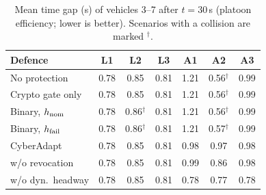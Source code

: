 \begin{table}[!t]\centering\caption{Mean time gap (s) of vehicles 3--7 after $t=30$\,s (platoon efficiency; lower is better). Scenarios with a collision are marked $^\dagger$.}\label{tab:hw}\footnotesize\setlength{\tabcolsep}{2.5pt}\begin{tabular}{lcccccc}\toprule
Defence & L1 & L2 & L3 & A1 & A2 & A3\\\midrule
No protection & 0.78 & 0.85 & 0.81 & 1.21 & 0.56$^\dagger$ & 0.99\\
Crypto gate only & 0.78 & 0.85 & 0.81 & 1.21 & 0.56$^\dagger$ & 0.99\\
Binary, $h_{\rm nom}$ & 0.78 & 0.86$^\dagger$ & 0.81 & 1.21 & 0.56$^\dagger$ & 0.99\\
Binary, $h_{\rm fail}$ & 0.78 & 0.86$^\dagger$ & 0.81 & 1.21 & 0.57$^\dagger$ & 0.99\\
CyberAdapt & 0.78 & 0.85 & 0.81 & 0.98 & 0.97 & 0.98\\
\quad w/o revocation & 0.78 & 0.85 & 0.81 & 0.99 & 0.86 & 0.98\\
\quad w/o dyn.\ headway & 0.78 & 0.85 & 0.81 & 0.78 & 0.77 & 0.78\\
\bottomrule\end{tabular}\end{table}
